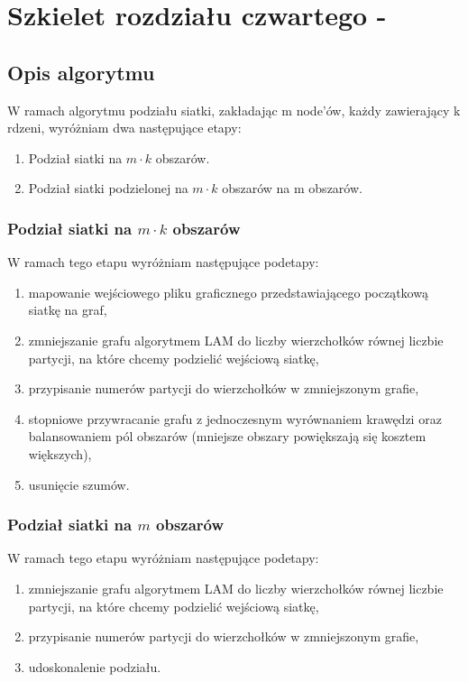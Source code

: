 \newpage


\section{Szkielet rozdziału czwartego - }

\subsection{Opis algorytmu}

W ramach algorytmu podziału siatki, zakładając m node'ów, każdy zawierający k rdzeni, wyróżniam dwa następujące etapy:

\begin{enumerate}
    \item Podział siatki na $m \cdot k$ obszarów.
    \item Podział siatki podzielonej na $m \cdot k$ obszarów na m obszarów.
\end{enumerate}

\subsubsection{Podział siatki na $m \cdot k$ obszarów}
W ramach tego etapu wyróżniam następujące podetapy:
        {\begin{enumerate}
             \item {mapowanie wejściowego pliku graficznego przedstawiającego początkową siatkę na graf,}
             \item {zmniejszanie grafu algorytmem LAM \cite{weighted_maching} do liczby wierzchołków równej liczbie partycji,
                 na które chcemy podzielić wejściową siatkę,}
             \item {przypisanie numerów partycji do wierzchołków w zmniejszonym grafie,}
             \item {stopniowe przywracanie grafu z jednoczesnym wyrównaniem krawędzi \cite{10.1007/3-540-44842-X_6} oraz balansowaniem pól obszarów (mniejsze
             obszary powiększają się kosztem większych),}
             \item {usunięcie szumów.}
\end{enumerate}}

\subsubsection{Podział siatki na $m$ obszarów}
W ramach tego etapu wyróżniam następujące podetapy:
\begin{enumerate}
    \item {zmniejszanie grafu algorytmem LAM \cite{weighted_maching} do liczby wierzchołków równej liczbie partycji,
        na które chcemy podzielić wejściową siatkę,}
    \item {przypisanie numerów partycji do wierzchołków w zmniejszonym grafie,}
    \item {udoskonalenie podziału.}
\end{enumerate}

